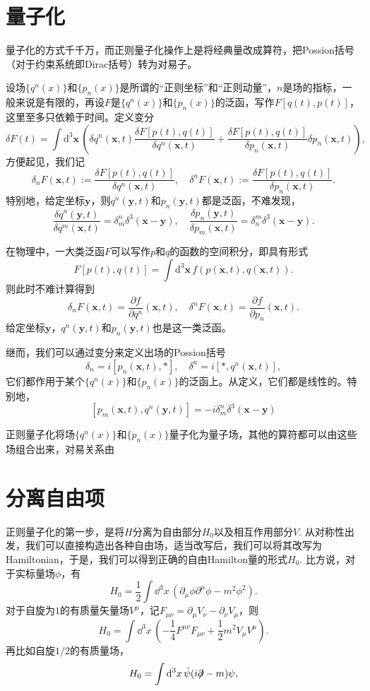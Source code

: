 \documentclass[11pt]{article}
\theoremstyle{definition}
\theoremstyle{plain}
\begin{document}
\section{量子化}

量子化的方式千千万，而正则量子化操作上是将经典量改成算符，把Possion括号（对于约束系统即Dirac括号）转为对易子。

设场$\{q^n(x)\}$和$\{p_n(x)\}$是所谓的“正则坐标”和“正则动量”，$n$是场的指标，一般来说是有限的，再设$F$是$\{q^n(x)\}$和$\{p_n(x)\}$的泛函，写作$F[q(t),p(t)]$，这里至多只依赖于时间。定义变分
\[
	\delta F(t)=\int \mathrm d^3\mathbf x \,\left(\delta q^n(\mathbf x,t)\frac{\delta F[p(t),q(t)] }{\delta q^n(\mathbf x,t)} +\frac{\delta F[p(t),q(t)] }{\delta p_n(\mathbf x,t)}\delta p_n(\mathbf x,t)\right),
\]
方便起见，我们记
\[
	\delta_n F(\mathbf x,t):=\frac{\delta F[p(t),q(t)]}{\delta q^n(\mathbf x,t)},\quad \delta^n F(\mathbf x,t):=\frac{\delta F[p(t),q(t)]}{\delta p_n(\mathbf x,t)}.
\]
特别地，给定坐标$\mathbf y$，则$q^n(\mathbf y,t)$和$p_n(\mathbf y,t)$都是泛函，不难发现，
\[
	\frac{\delta q^n(\mathbf y,t)}{\delta q^m(\mathbf x,t)}=\delta^n_m\delta^3(\mathbf x-\mathbf y),\quad  \frac{\delta p_n(\mathbf y,t)}{\delta p_m(\mathbf x,t)}=\delta^m_n\delta^3(\mathbf x-\mathbf y).
\]

在物理中，一大类泛函$F$可以写作$p$和$q$的函数的空间积分，即具有形式
\[
	F[p(t),q(t)]=\int\mathrm d^3 \mathbf x \,f(p(\mathbf x,t),q(\mathbf x,t)).
\]
则此时不难计算得到
\[
	\delta_n F(\mathbf x,t)=\frac{\partial f}{\partial q^n}(\mathbf x,t),\quad \delta^n F(\mathbf x,t)=\frac{\partial f}{\partial p_n}(\mathbf x,t).
\]
给定坐标$\mathbf y$，$q^n(\mathbf y,t)$和$p_n(\mathbf y,t)$也是这一类泛函。

继而，我们可以通过变分来定义出场的Possion括号
\[
   \delta_n=i\left[p_n(\mathbf x,t),*\right],\quad \delta^n=i\left[*,q^n(\mathbf x,t)\right],
\]
它们都作用于某个$\{q^n(x)\}$和$\{p_n(x)\}$的泛函上。从定义，它们都是线性的。特别地，
\[
[p_m(\mathbf x,t),q^n(\mathbf y,t)]=-i\delta^n_m\delta^3(\mathbf x-\mathbf y)
\]

正则量子化将场$\{q^n(x)\}$和$\{p_n(x)\}$量子化为量子场，其他的算符都可以由这些场组合出来，对易关系由

\section{分离自由项}

正则量子化的第一步，是将$H$分离为自由部分$H_0$以及相互作用部分$V$. 从对称性出发，我们可以直接构造出各种自由场，适当改写后，我们可以将其改写为Hamiltonian，于是，我们可以得到正确的自由Hamilton量的形式$H_0$. 比方说，对于实标量场$\phi$，有
\[
	H_0=\frac 12 \int \dd^3 x \,\left(\partial_\mu\phi\partial^\mu\phi-m^2\phi^2\right).
\]
对于自旋为$1$的有质量矢量场$V^\mu$，记$F_{\mu\nu}=\partial_{\mu}V_{\nu}-\partial_{\nu}V_{\mu}$，则
\[
	H_0=\int \dd^3 x \,\left(-\frac 14 F^{\mu\nu}F_{\mu\nu}+\frac 12 m^2V_{\mu}V^\mu\right).
\]
再比如自旋$1/2$的有质量场，
\[
	H_0=\int \mathrm{d}^3 x \,\bar\psi(i\partial\!\!\!/-m)\psi,
\]
\end{document}
